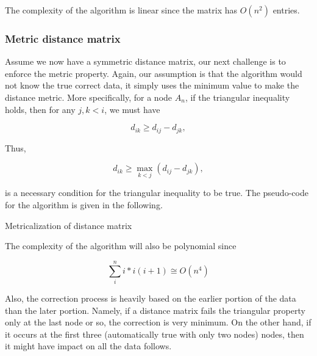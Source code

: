 The complexity of the algorithm is linear since the matrix 
has $O(n^2)$ entries.

\subsubsection{Metric distance matrix}
Assume we now have a symmetric distance matrix, our next 
challenge is to enforce the metric property. Again, 
our assumption is that the algorithm would not know the 
true correct data, it simply uses the minimum value to make 
the distance metric. More specifically, for a node $A_n$, 
if the triangular inequality holds, then for any $j,k < i$, 
we must have

\[
d_{ik} \geq d_{ij} - d_{jk},
\]

Thus,

\[
d_{ik} \geq \max_{k<j}(d_{ij} - d_{jk}),
\]

is a necessary condition for the triangular inequality to be true. 
The pseudo-code for the algorithm is given in the following.

\begin{algorithm}[H]
\SetAlgoRefName{}	
\caption{Metricalization of distance matrix}
\end{algorithm}

The complexity of the algorithm will also be polynomial since

\[
\sum_i^n i*i(i+1) \cong O(n^4)
\]

Also, the correction process is heavily based on the earlier 
portion of the data than the later portion. Namely, if a 
distance matrix fails the triangular property only at the 
last node or so, the correction is very minimum. 
On the other hand, if it occurs at the first three 
(automatically true with only two nodes) nodes, then it 
might have impact on all the data follows.



\newpage